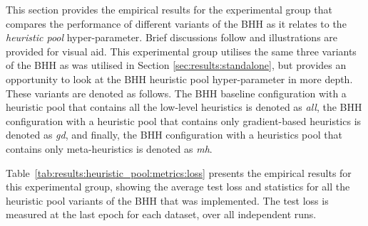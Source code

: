This section provides the empirical results for the experimental group that compares the performance of different variants of the \acs{BHH} as it relates to the \textit{heuristic pool} hyper-parameter. Brief discussions follow and illustrations are provided for visual aid. This experimental group utilises the same three variants of the \acs{BHH} as was utilised in Section \ref{sec:results:standalone}, but provides an opportunity to look at the \acs{BHH} heuristic pool hyper-parameter in more depth. These variants are denoted as follows. The \acs{BHH} baseline configuration with a heuristic pool that contains all the low-level heuristics is denoted as \textit{all}, the \acs{BHH} configuration with a heuristic pool that contains only gradient-based heuristics is denoted as \textit{gd}, and finally, the \acs{BHH} configuration with a heuristics pool that contains only meta-heuristics is denoted as \textit{mh}.

Table~\ref{tab:results:heuristic_pool:metrics:loss} presents the empirical results for this experimental group, showing the average test loss and statistics for all the heuristic pool variants of the \acs{BHH} that was implemented. The test loss is measured at the last epoch for each dataset, over all independent runs.

